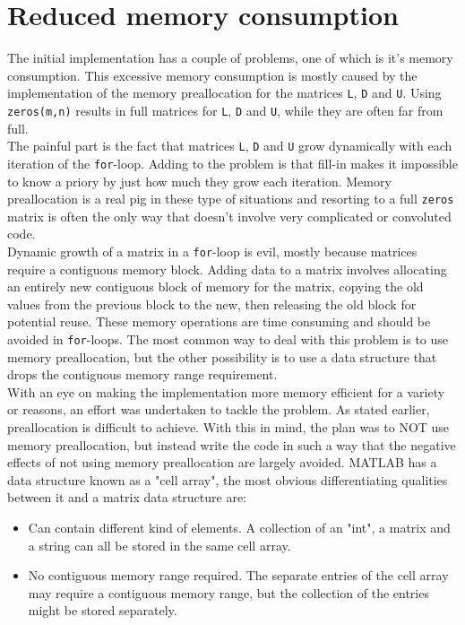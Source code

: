 \chapter{Reduced memory consumption}

The initial implementation has a couple of problems, one of which is it's memory consumption. This excessive memory consumption is mostly caused by the implementation of the memory preallocation for the matrices \texttt{L}, \texttt{D} and \texttt{U}. Using \texttt{zeros(m,n)} results in full matrices for \texttt{L}, \texttt{D} and \texttt{U}, while they are often far from full.\\

\noindent The painful part is the fact that matrices \texttt{L}, \texttt{D} and \texttt{U} grow dynamically with each iteration of the \texttt{for}-loop. Adding to the problem is that fill-in makes it impossible to know a priory by just how much they grow each iteration. Memory preallocation is a real pig in these type of situations and resorting to a full \texttt{zeros} matrix is often the only way that doesn't involve very complicated or convoluted code.\\

\noindent Dynamic growth of a matrix in a \texttt{for}-loop is evil, mostly because matrices require a contiguous memory block. Adding data to a matrix involves allocating an entirely new contiguous block of memory for the matrix, copying the old values from the previous block to the new, then releasing the old block for potential reuse. These memory operations are time consuming and should be avoided in \texttt{for}-loops. The most common way to deal with this problem is to use memory preallocation, but the other possibility is to use a data structure that drops the contiguous memory range requirement.\\

\noindent With an eye on making the implementation more memory efficient for a variety or reasons, an effort was undertaken to tackle the problem. As stated earlier, preallocation is difficult to achieve. With this in mind, the plan was to NOT use memory preallocation, but instead write the code in such a way that the negative effects of not using memory preallocation are largely avoided. MATLAB has a data structure known as a "cell array"\autocite[]{math_doc_cell}, the most obvious differentiating qualities between it and a matrix data structure are:

\begin{itemize}
    \item Can contain different kind of elements. A collection of an "int", a matrix and a string can all be stored in the same cell array.
    \item No contiguous memory range required. The separate entries of the cell array may require a contiguous memory range, but the collection of the entries might be stored separately.
\end{itemize}

